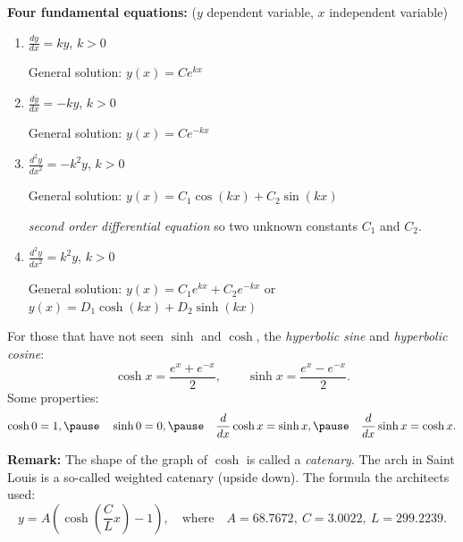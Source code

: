 \documentclass[10pt,aspectratio=169]{beamer}
\begin{document}
\begin{frame}
\textbf{Four fundamental equations:} ($y$ dependent variable, $x$ independent variable)

\medskip
\begin{enumerate}
\item\pause
$\displaystyle \frac{dy}{dx} = k y$, \quad $k > 0$

\medskip
\pause
General solution: \quad $y(x) = C e^{kx}$

\medskip
\item\pause
$\displaystyle \frac{dy}{dx} = -k y$, \quad $k > 0$

\medskip
\pause
General solution: \quad $y(x) = C e^{-kx}$

\medskip
\item\pause
$\displaystyle \frac{d^2y}{{dx}^2} = -k^2 y$, \quad $k > 0$

\medskip
\pause
General solution: \quad $y(x) = C_1 \cos(kx) + C_2 \sin(kx)$

\pause
\emph{second order differential equation} so two unknown constants $C_1$ and $C_2$.

\medskip
\item\pause
$\displaystyle \frac{d^2y}{{dx}^2} = k^2 y$, \quad $k > 0$

\medskip
\pause
General solution: \quad $y(x) = C_1 e^{kx}  + C_2 e^{-kx}$
\pause
\quad or \quad $y(x) = D_1 \cosh(kx) + D_2 \sinh(kx)$

\end{enumerate}

\end{frame}

\begin{frame}
For those that have not seen $\sinh$ and $\cosh$, the
\emph{hyperbolic sine} and \emph{hyperbolic cosine}:
\[
\cosh x = \frac{e^{x} + e^{-x}}{2} , \qquad
\sinh x = \frac{e^{x} - e^{-x}}{2} .
\]
\pause
Some properties:
\[
\cosh 0 = 1,
\pause
\quad
\sinh 0 = 0,
\pause
\quad
\frac{d}{dx} \cosh x = \sinh x,
\pause
\quad
\frac{d}{dx} \sinh x = \cosh x.
\]

\medskip
\pause
\textbf{Remark:} The shape of the graph of $\cosh$ is called a \emph{catenary}.
The arch in Saint Louis is a so-called weighted catenary (upside down).
The formula the architects used:
\begin{equation*}
y = A\left( \cosh \left( \frac{C}{L} x \right) - 1 \right), \quad
\text{where}
\quad
A=68.7672,~
C=3.0022,~
L = 299.2239.
\end{equation*}


\end{frame}
\end{document}
